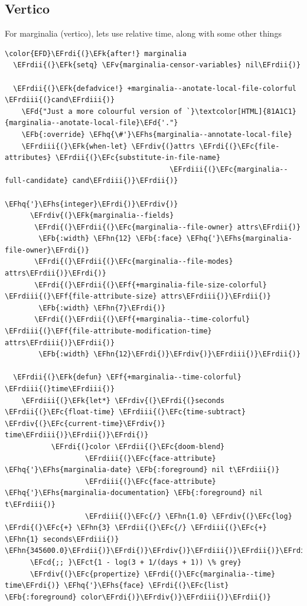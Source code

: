 \documentclass{scrartcl}
\newcommand{\EFk}[1]{\textcolor{EFk}{#1}} %
\newcommand{\EFd}[1]{\textcolor{EFd}{#1}} %
\newcommand{\EFb}[1]{\textcolor{EFb}{#1}} %
\newcommand{\EFct}[1]{\textcolor{EFct}{#1}} %
\newcommand{\EFc}[1]{\textcolor{EFc}{#1}} %
\newcommand{\EFv}[1]{\textcolor{EFv}{#1}} %
\newcommand{\EFf}[1]{\textcolor{EFf}{#1}} %
\newcommand{\EFcd}[1]{\textcolor{EFcd}{#1}} %
\newcommand{\EFhn}[1]{#1} %
\newcommand{\EFhq}[1]{#1} %
\newcommand{\EFhs}[1]{#1} %
\newcommand{\EFrdi}[1]{#1} %
\newcommand{\EFrdii}[1]{#1} %
\newcommand{\EFrdiii}[1]{#1} %
\newcommand{\EFrdiv}[1]{#1} %
\begin{document}
\subsection{Vertico}
\label{sec:org350d380}
For marginalia (vertico), lets use relative time, along with some other things
\begin{Code}
\begin{Verbatim}[]
\color{EFD}\EFrdi{(}\EFk{after!} marginalia
  \EFrdii{(}\EFk{setq} \EFv{marginalia-censor-variables} nil\EFrdii{)}

  \EFrdii{(}\EFk{defadvice!} +marginalia--anotate-local-file-colorful \EFrdiii{(}cand\EFrdiii{)}
    \EFd{"Just a more colourful version of `}\textcolor[HTML]{81A1C1}{marginalia--anotate-local-file}\EFd{'."}
    \EFb{:override} \EFhq{\#'}\EFhs{marginalia--annotate-local-file}
    \EFrdiii{(}\EFk{when-let} \EFrdiv{(}attrs \EFrdi{(}\EFc{file-attributes} \EFrdii{(}\EFc{substitute-in-file-name}
                                       \EFrdiii{(}\EFc{marginalia--full-candidate} cand\EFrdiii{)}\EFrdii{)}
                                      \EFhq{'}\EFhs{integer}\EFrdi{)}\EFrdiv{)}
      \EFrdiv{(}\EFk{marginalia--fields}
       \EFrdi{(}\EFrdii{(}\EFc{marginalia--file-owner} attrs\EFrdii{)}
        \EFb{:width} \EFhn{12} \EFb{:face} \EFhq{'}\EFhs{marginalia-file-owner}\EFrdi{)}
       \EFrdi{(}\EFrdii{(}\EFc{marginalia--file-modes} attrs\EFrdii{)}\EFrdi{)}
       \EFrdi{(}\EFrdii{(}\EFf{+marginalia-file-size-colorful} \EFrdiii{(}\EFf{file-attribute-size} attrs\EFrdiii{)}\EFrdii{)}
        \EFb{:width} \EFhn{7}\EFrdi{)}
       \EFrdi{(}\EFrdii{(}\EFf{+marginalia--time-colorful} \EFrdiii{(}\EFf{file-attribute-modification-time} attrs\EFrdiii{)}\EFrdii{)}
        \EFb{:width} \EFhn{12}\EFrdi{)}\EFrdiv{)}\EFrdiii{)}\EFrdii{)}

  \EFrdii{(}\EFk{defun} \EFf{+marginalia--time-colorful} \EFrdiii{(}time\EFrdiii{)}
    \EFrdiii{(}\EFk{let*} \EFrdiv{(}\EFrdi{(}seconds \EFrdii{(}\EFc{float-time} \EFrdiii{(}\EFc{time-subtract} \EFrdiv{(}\EFc{current-time}\EFrdiv{)} time\EFrdiii{)}\EFrdii{)}\EFrdi{)}
           \EFrdi{(}color \EFrdii{(}\EFc{doom-blend}
                   \EFrdiii{(}\EFc{face-attribute} \EFhq{'}\EFhs{marginalia-date} \EFb{:foreground} nil t\EFrdiii{)}
                   \EFrdiii{(}\EFc{face-attribute} \EFhq{'}\EFhs{marginalia-documentation} \EFb{:foreground} nil t\EFrdiii{)}
                   \EFrdiii{(}\EFc{/} \EFhn{1.0} \EFrdiv{(}\EFc{log} \EFrdi{(}\EFc{+} \EFhn{3} \EFrdii{(}\EFc{/} \EFrdiii{(}\EFc{+} \EFhn{1} seconds\EFrdiii{)} \EFhn{345600.0}\EFrdii{)}\EFrdi{)}\EFrdiv{)}\EFrdiii{)}\EFrdii{)}\EFrdi{)}\EFrdiv{)}
      \EFcd{;; }\EFct{1 - log(3 + 1/(days + 1)) \% grey}
      \EFrdiv{(}\EFc{propertize} \EFrdi{(}\EFc{marginalia--time} time\EFrdi{)} \EFhq{'}\EFhs{face} \EFrdi{(}\EFc{list} \EFb{:foreground} color\EFrdi{)}\EFrdiv{)}\EFrdiii{)}\EFrdii{)}


\end{Verbatim}
\end{Code}
\end{document}
